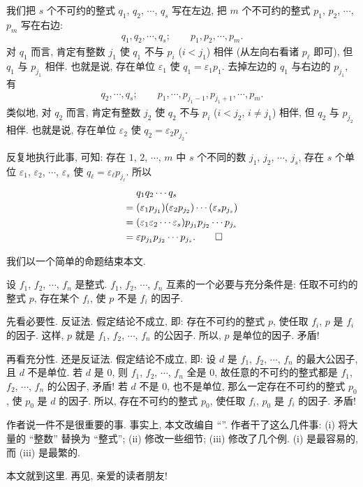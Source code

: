 \begin{pf}
    我们把 $s$ 个不可约的整式 $q_1$, $q_2$, $\cdots$, $q_s$ 写在左边, 把 $m$ 个不可约的整式 $p_1$, $p_2$, $\cdots$, $p_m$ 写在右边:
    \begin{align*}
        q_1, q_2, \cdots, q_s; \qquad p_1, p_2, \cdots, p_m.
    \end{align*}
    对 $q_1$ 而言, 肯定有整数 $j_1$ 使 $q_1$ 不与 $p_i$ ($i < j_1$) 相伴 (从左向右看诸 $p_\ell$ 即可), 但 $q_1$ 与 $p_{j_1}$ 相伴. 也就是说, 存在单位 $\varepsilon_1$ 使 $q_1 = \varepsilon_1 p_1$. 去掉左边的 $q_1$ 与右边的 $p_{j_1}$, 有
    \begin{align*}
        q_2, \cdots, q_s; \qquad p_1, \cdots, p_{j_1 - 1}, p_{j_1 + 1}, \cdots, p_m.
    \end{align*}
    类似地, 对 $q_2$ 而言, 肯定有整数 $j_2$ 使 $q_2$ 不与 $p_i$ ($i < j_2$, $i \neq j_1$) 相伴, 但 $q_2$ 与 $p_{j_2}$ 相伴. 也就是说, 存在单位 $\varepsilon_2$ 使 $q_2 = \varepsilon_2 p_{j_2}$.

    反复地执行此事, 可知: 存在 $1$, $2$, $\cdots$, $m$ 中 $s$ 个不同的数 $j_1$, $j_2$, $\cdots$, $j_s$, 存在 $s$ 个单位 $\varepsilon_1$, $\varepsilon_2$, $\cdots$, $\varepsilon_s$ 使 $q_\ell = \varepsilon_\ell p_{j_\ell}$. 所以
    \begin{align*}
             & q_1 q_2 \cdots q_s                                                                \\
        = {} & (\varepsilon_1 p_{j_1}) (\varepsilon_2 p_{j_2}) \cdots (\varepsilon_s p_{j_s})    \\
        = {} & (\varepsilon_1 \varepsilon_2 \cdots \varepsilon_s) p_{j_1} p_{j_2} \cdots p_{j_s} \\
        = {} & \varepsilon p_{j_1} p_{j_2} \cdots p_{j_s}. \qedhere
    \end{align*}
\end{pf}

我们以一个简单的命题结束本文.

\begin{proposition}
    设 $f_1$, $f_2$, $\cdots$, $f_n$ 是整式. $f_1$, $f_2$, $\cdots$, $f_n$ 互素的一个必要与充分条件是: 任取不可约的整式 $p$, 存在某个 $f_i$, 使 $p$ 不是 $f_i$ 的因子.
\end{proposition}

\begin{pf}
    先看必要性. 反证法. 假定结论不成立, 即: 存在不可约的整式 $p$, 使任取 $f_i$, $p$ 是 $f_i$ 的因子. 这样, $p$ 就是 $f_1$, $f_2$, $\cdots$, $f_n$ 的公因子. 所以, $p$ 是单位的因子. 矛盾!

    再看充分性. 还是反证法. 假定结论不成立, 即: 设 $d$ 是 $f_1$, $f_2$, $\cdots$, $f_n$ 的最大公因子, 且 $d$ 不是单位. 若 $d$ 是 $0$, 则 $f_1$, $f_2$, $\cdots$, $f_n$ 全是 $0$, 故任意的不可约的整式都是 $f_1$, $f_2$, $\cdots$, $f_n$ 的公因子, 矛盾! 若 $d$ 不是 $0$, 也不是单位, 那么一定存在不可约的整式 $p_0$, 使 $p_0$ 是 $d$ 的因子. 所以, 存在不可约的整式 $p_0$, 使任取 $f_i$, $p_0$ 是 $f_i$ 的因子. 矛盾!
\end{pf}

\begin{remark}
    作者说一件不是很重要的事. 事实上, 本文改编自 ``\SomePropertiesOfIntegers''. 作者干了这么几件事: (i) 将大量的 ``整数'' 替换为 ``整式''; (ii) 修改一些细节; (iii) 修改了几个例. (i) 是最容易的, 而 (iii) 是最繁的.
\end{remark}

本文就到这里. 再见, 亲爱的读者朋友!
